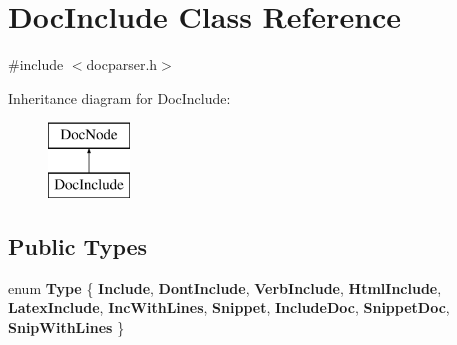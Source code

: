\hypertarget{class_doc_include}{}\section{Doc\+Include Class Reference}
\label{class_doc_include}


{\ttfamily \#include $<$docparser.\+h$>$}

Inheritance diagram for Doc\+Include\+:\begin{figure}[H]
\begin{center}
\leavevmode
\includegraphics[height=2.000000cm]{class_doc_include}
\end{center}
\end{figure}
\subsection*{Public Types}
\begin{DoxyCompactItemize}
\item 
\mbox{\label{class_doc_include_a72aa0fd397546547aadf356348ff3eaf}} 
enum {\bfseries Type} \{ \newline
{\bfseries Include}, 
{\bfseries Dont\+Include}, 
{\bfseries Verb\+Include}, 
{\bfseries Html\+Include}, 
\newline
{\bfseries Latex\+Include}, 
{\bfseries Inc\+With\+Lines}, 
{\bfseries Snippet}, 
{\bfseries Include\+Doc}, 
\newline
{\bfseries Snippet\+Doc}, 
{\bfseries Snip\+With\+Lines}
 \}
\end{DoxyCompactItemize}
